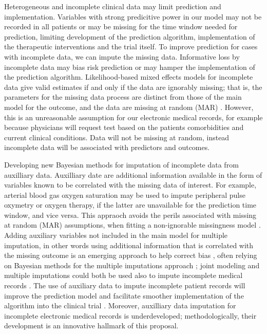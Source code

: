 \documentclass[11pt,notitlepage]{article}
\begin{document}
Heterogeneous and incomplete clinical data may limit prediction and implementation.
Variables with strong predicitive power in our model may not be recorded in all patients or may be missing for the time window needed for prediction, limiting development of the prediction algorithm, implementation of the therapeutic interventions and the trial itself. To improve prediction for cases with incomplete data, we can impute the missing data. Informative loss by incomplete data may bias risk prediction or may hamper the implementation of the prediction algorithm. Likelihood-based mixed effects models for incomplete data give valid estimates if and only if the data are ignorably missing; that is, the parameters for the missing data process are distinct from those of the main model for the outcome, and the data are missing at random (MAR) \cite{Rubin_1976}. However, this is an unreasonable assumption for our electronic medical records, for example because physicians will request test based on the patients comorbidities and current clinical conditions. Data will not be missing at random, instead incomplete data will be associated with predictors and outcomes.

Developing new Bayesian methods for imputation of incomplete data from auxilliary data.
Auxilliary date are additional information available in the form of variables known to be correlated with the missing data of interest. For example, arterial blood gas oxygen saturation may be used to impute peripheral pulse oxymetry or oxygen therapy, if the latter are unavailable for the prediction time window, and vice versa. This appraoch avoids the perils associated with missing at random (MAR) assumptions, when fitting a non-ignorable missingness model \cite{Wang_20029935}. Adding auxiliary variables not included in the main model for multiple imputation, in other words using additional information that is correlated with the missing outcome is an emerging approach to help correct bias \cite{Meng_1994; @Collins_11778676; @Rubin_1996}, often relying on Bayesian methods for the multiple imputations approach \cite{Daniels_2008; @Schafer_1997}; joint modeling and multiple imputations could both be used also to impute incomplete medical records \cite{Fitzmaurice_2008}. The use of auxiliary data to impute incomplete patient records will improve the prediction model and facilitate smoother implementation of the algorithm into the clinical trial \cite{Hall_25389642}. Moreover, auxilliary data imputation for incomplete electronic medical records is underdeveloped; methodologically, their development is an innovative hallmark of this proposal.
\end{document}
